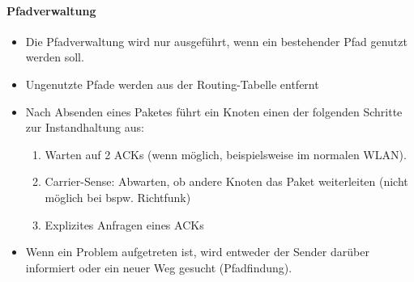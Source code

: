 		    \paragraph{Pfadverwaltung}
			    \begin{itemize}
			    	\item Die Pfadverwaltung wird nur ausgeführt, wenn ein bestehender Pfad genutzt werden soll.
			    	\item Ungenutzte Pfade werden aus der Routing-Tabelle entfernt
			    	\item Nach Absenden eines Paketes führt ein Knoten einen der folgenden Schritte zur Instandhaltung aus:
				    	\begin{enumerate}
				    		\item Warten auf 2 ACKs (wenn möglich, beispielsweise im normalen WLAN).
				    		\item Carrier-Sense: Abwarten, ob andere Knoten das Paket weiterleiten (nicht möglich bei bspw. Richtfunk)
				    		\item Explizites Anfragen eines ACKs
				    	\end{enumerate}
			    	\item Wenn ein Problem aufgetreten ist, wird entweder der Sender darüber informiert oder ein neuer Weg gesucht (Pfadfindung).
			    \end{itemize}

